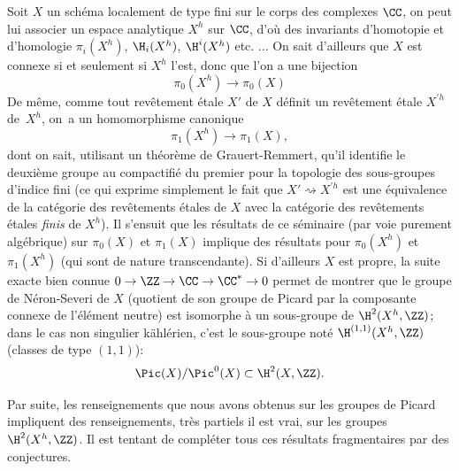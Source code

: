 Soit $X$ un sch\'ema localement de type fini sur le corps des complexes $\CC$, on peut lui associer un espace analytique $X^h$ sur $\CC$, d'o\`u des invariants d'homotopie et d'homologie $\pi_i(X^h)$, $\H_i(X^h)$, $\H^i(X^h)$ etc. ... On sait d'ailleurs que $X$ est connexe si et seulement si $X^h$ l'est, donc que l'on a une bijection
$$
\pi_0(X^h)\to \pi_0(X)$$
De m\^eme, comme tout rev\^etement \'etale $X'$ de $X$ d\'efinit un rev\^etement \'etale $X^{\prime h}$ de~$X^h$\pageoriginale, on~a un homomorphisme canonique
$$
\pi_1(X^h)\to \pi_1(X),
$$
dont on sait, utilisant un th\'eor\`eme de Grauert-Remmert, qu'il identifie le deuxi\`eme groupe au compactifi\'e du premier pour la topologie des sous-groupes d'indice fini (ce qui exprime simplement le fait que $X'\rightsquigarrow X^{\prime h}$ est une \'equivalence de la cat\'egorie des rev\^etements \'etales de $X$ avec la cat\'egorie des rev\^etements \'etales \emph{finis} de $X^h$). Il s'ensuit que les r\'esultats de ce s\'eminaire (par voie purement alg\'ebrique) sur $\pi_0(X)$ et $\pi_1(X)$ implique des r\'esultats pour $\pi_0(X^h)$ et $\pi_1(X^h)$ (qui sont de nature transcendante). Si d'ailleurs $X$ est propre, la suite exacte bien connue $0\to \ZZ \to \CC\to \CC^*\to 0$ permet de montrer que le groupe de N\'eron-Severi de $X$ (quotient de son groupe de Picard par la composante connexe de l'\'el\'ement neutre) est isomorphe \`a un sous-groupe de $\H^2(X^h, \ZZ)$; dans le cas non singulier k\"ahl\'erien, c'est le sous-groupe not\'e $\H^{(1, 1)}(X^h, \ZZ)$ (classes de type $(1, 1)$):
$$
\Pic(X)/\Pic^0(X)\subset \H^2(X, \ZZ).
$$

Par suite, les renseignements que nous avons obtenus sur les groupes de Picard impliquent des renseignements, tr\`es partiels il est vrai, sur les groupes $\H^2(X^h, \ZZ)$. Il est tentant de compl\'eter tous ces r\'esultats fragmentaires par des conjectures.

